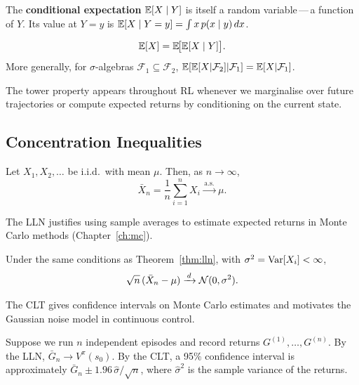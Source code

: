 The \textbf{conditional expectation} $\operatorname{\mathbb{E}}[X \mid Y]$ is itself a random
variable\,---\,a function of $Y$.  Its value at $Y=y$ is
$\operatorname{\mathbb{E}}[X \mid Y=y] = \int x\,p(x \mid y)\,dx$.

\begin{theorem}
\label{thm:tower}
\[
    \operatorname{\mathbb{E}}[X] = \operatorname{\mathbb{E}}\!\bigl[\operatorname{\mathbb{E}}[X \mid Y]\bigr].
\]
More generally, for $\sigma$-algebras $\mathcal{F}_1 \subseteq \mathcal{F}_2$,
$\operatorname{\mathbb{E}}[\operatorname{\mathbb{E}}[X|\mathcal{F}_2]|\mathcal{F}_1] = \operatorname{\mathbb{E}}[X|\mathcal{F}_1]$.
\end{theorem}

The tower property appears throughout RL whenever we marginalise over
future trajectories or compute expected returns by conditioning on the
current state.

\subsection*{Concentration Inequalities}

\begin{theorem}
\label{thm:lln}
Let $X_1, X_2, \ldots$ be i.i.d.\ with mean $\mu$.  Then, as $n \to \infty$,
\[
    \bar{X}_n = \frac{1}{n}\sum_{i=1}^n X_i \xrightarrow{\,\text{a.s.}\,} \mu.
\]
\end{theorem}

The LLN justifies using sample averages to estimate expected returns in
Monte Carlo methods (Chapter~\ref{ch:mc}).

\begin{theorem}
\label{thm:clt}
Under the same conditions as Theorem~\ref{thm:lln}, with
$\sigma^2 = \operatorname{Var}[X_i] < \infty$,
\[
    \sqrt{n}\,(\bar{X}_n - \mu) \xrightarrow{\,d\,} \mathcal{N}(0, \sigma^2).
\]
\end{theorem}

The CLT gives confidence intervals on Monte Carlo estimates and motivates
the Gaussian noise model in continuous control.

\begin{example}
Suppose we run $n$ independent episodes and record returns
$G^{(1)}, \ldots, G^{(n)}$.  By the LLN, $\bar{G}_n \to V^\pi(s_0)$.
By the CLT, a 95\% confidence interval is approximately
$\bar{G}_n \pm 1.96\,\hat{\sigma}/\sqrt{n}$, where $\hat{\sigma}^2$
is the sample variance of the returns.
\end{example}

